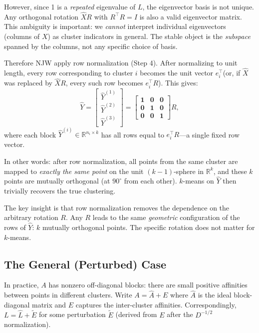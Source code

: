 \documentclass[11pt]{article}
\theoremstyle{plain}
\theoremstyle{definition}
\begin{document}
However, since 1 is a \emph{repeated} eigenvalue of $L$, the eigenvector basis is not unique. Any orthogonal rotation $\hat{X} R$ with $R^\top R = I$ is also a valid eigenvector matrix. This ambiguity is important: we \emph{cannot} interpret individual eigenvectors (columns of $X$) as cluster indicators in general. The stable object is the \emph{subspace} spanned by the columns, not any specific choice of basis.

Therefore NJW apply row normalization (Step 4). After normalizing to unit length, every row corresponding to cluster $i$ becomes the unit vector $e_i^\top$(or, if $\hat{X}$ was replaced by $\hat{X}R$, every such row becomes $e_i^\top R$). This gives:
\begin{equation}
    \hat{Y} = \begin{bmatrix} \hat{Y}^{(1)} \\ \hat{Y}^{(2)} \\ \hat{Y}^{(3)} \end{bmatrix}
    = \begin{bmatrix} \mathbf{1} & \mathbf{0} & \mathbf{0} \\ \mathbf{0} & \mathbf{1} & \mathbf{0} \\ \mathbf{0} & \mathbf{0} & \mathbf{1} \end{bmatrix} R,
    \label{eq:Y_ideal}
\end{equation}
where each block $\hat{Y}^{(i)} \in \mathbb{R}^{n_i \times k}$ has all rows equal to $e_i^\top R$---a single fixed row vector.

In other words: after row normalization, all points from the same cluster are mapped to \emph{exactly the same point} on the unit $(k-1)$-sphere in $\mathbb{R}^k$, and these $k$ points are mutually orthogonal (at $90^\circ$ from each other). $k$-means on $\hat{Y}$ then trivially recovers the true clustering.

The key insight is that row normalization removes the dependence on the arbitrary rotation $R$. Any $R$ leads to the same \emph{geometric} configuration of the rows of $\hat{Y}$: $k$ mutually orthogonal points. The specific rotation does not matter for $k$-means.

\subsection{The General (Perturbed) Case}

In practice, $A$ has nonzero off-diagonal blocks: there are small positive affinities between points in different clusters. Write $A = \hat{A} + E$ where $\hat{A}$ is the ideal block-diagonal matrix and $E$ captures the inter-cluster affinities. Correspondingly, $L = \hat{L} + \tilde{E}$ for some perturbation $\tilde{E}$ (derived from $E$ after the $D^{-1/2}$ normalization).
\end{document}
